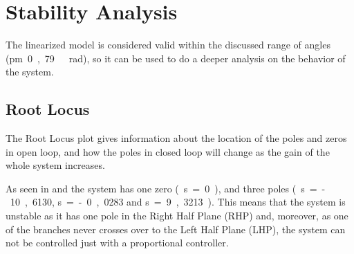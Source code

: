 \section{Stability Analysis}
The linearized model is considered valid within the discussed range of angles (\si{\pm 0,79\ rad}), so it can be used to do a deeper analysis on the behavior of the system. %

%
%
%

\subsection{Root Locus}
The Root Locus plot gives information about the location of the poles and zeros in open loop, and how the poles in closed loop will change as the gain of the whole system increases.

As seen in  and  the system has one zero \si{(s=0)}, and three poles \si{(s=-10,6130}, \si{s=-0,0283} and \si{s=9,3213)}. This means that the system is unstable as it has one pole in the Right Half Plane (RHP) and, moreover, as one of the branches never crosses over to the Left Half Plane (LHP), the system can not be controlled just with a proportional controller.

